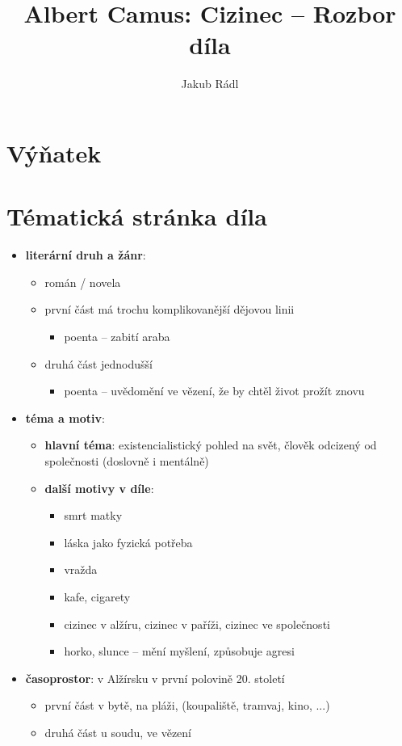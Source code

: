 \documentclass[10pt,a4paper]{article}
\date{}
\author{Jakub Rádl}
\title{Albert Camus: Cizinec -- Rozbor díla}
\begin{document}
\maketitle

\section*{Výňatek}

\section*{Tématická stránka díla}
\begin{itemize}
\item \textbf{literární druh a žánr}: 
	\begin{itemize}
	\item román / novela
	\item první část má trochu komplikovanější dějovou linii
		\begin{itemize}
		\item poenta -- zabití araba
		\end{itemize}
	\item druhá část jednodušší
		\begin{itemize}
		\item poenta -- uvědomění ve vězení, že by chtěl život prožít znovu
		\end{itemize}
	\end{itemize}
\item \textbf{téma a motiv}:
	\begin{itemize}
	\item \textbf{hlavní téma}: existencialistický pohled na svět, člověk odcizený od společnosti (doslovně i mentálně)
	\item \textbf{další motivy v díle}: 
		\begin{itemize}
		\item smrt matky
		\item láska jako fyzická potřeba
		\item vražda
		\item kafe, cigarety
		\item cizinec v alžíru, cizinec v paříži, cizinec ve společnosti
		\item horko, slunce -- mění myšlení, způsobuje agresi
		\end{itemize}
	\end{itemize}
\item \textbf{časoprostor}: v Alžírsku v první polovině 20. století
	\begin{itemize}
	\item první část v bytě, na pláži, (koupaliště, tramvaj, kino, ...)
	\item druhá část u soudu, ve vězení
	\end{itemize}


\end{itemize}
\end{document}
